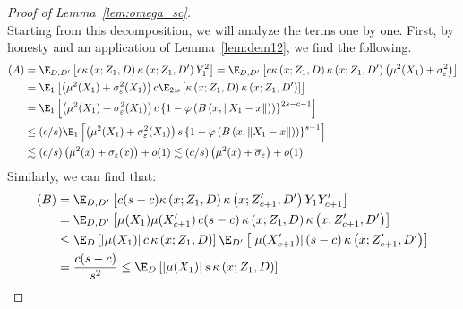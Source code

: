 \begin{proof}[Proof of Lemma~\ref{lem:omega_sc}]
\begin{equation}
	\end{equation}
	Starting from this decomposition, we will analyze the terms one by one.
	First, by honesty and an application of Lemma~\ref{lem:dem12}, we find the following.
	\begin{equation}
		\begin{aligned}
            (A) & = 
			\E_{D, D^{\prime}}\left[c\kappa\left(x; Z_{1}, D\right)\kappa\left(x; Z_{1}, D^{\prime}\right)Y_{1}^{2}\right]
			= \E_{D, D^{\prime}}\left[c\kappa\left(x; Z_{1}, D\right)\kappa\left(x; Z_{1}, D^{\prime}\right)\left(\mu^2(X_1) + \sigma_{\varepsilon}^{2}\right)\right]                                 \\
			 & = \E_{1}\left[\left(\mu^2(X_1) + \sigma_{\varepsilon}^{2}(X_1)\right) c\E_{2:s}\left[\kappa\left(x; Z_{1}, D\right)\kappa\left(x; Z_{1}, D^{\prime}\right)\right]\right] \\
			 & = \E_{1}\left[\left(\mu^2(X_1) + \sigma_{\varepsilon}^{2}(X_1)\right) c\left\{1 - \varphi\left(B\left(x, \|X_1 - x\|\right)\right)\right\}^{2s-c-1}\right]                        \\
			 & \leq (c/s) \E_{1}\left[\left(\mu^2(X_1) + \sigma_{\varepsilon}^{2}(X_1)\right) s\left\{1 - \varphi\left(B\left(x, \|X_1 - x\|\right)\right)\right\}^{s-1}\right]                  \\
			 & \lesssim (c/s)\left(\mu^2(x) + \sigma_{\varepsilon}(x)\right) + o(1)
			\lesssim (c/s)\left(\mu^2(x) + \overline{\sigma}_{\varepsilon}\right) + o(1)
		\end{aligned}
	\end{equation}
	Similarly, we can find that:
	\begin{equation}
		\begin{aligned}
            (B)
			 & = \E_{D, D^{\prime}}\left[c(s-c) \kappa\left(x; Z_{1}, D\right)\kappa\left(x; Z_{c+1}^{\prime}, D^{\prime}\right)Y_{1}Y_{c+1}^{\prime}\right]                                          \\
			 & = \E_{D, D^{\prime}}\left[\mu(X_1)\mu(X_{c+1}^{\prime}) \, c(s-c) \, \kappa\left(x; Z_{1}, D\right)\kappa\left(x; Z_{c+1}^{\prime}, D^{\prime}\right)\right] \\
			 & \leq \E_{D}\left[|\mu(X_1)| \, c \, \kappa\left(x; Z_{1}, D\right)\right]
			\E_{D^{\prime}}\left[|\mu(X_{c+1}^{\prime})| \, (s-c) \, \kappa\left(x; Z_{c+1}^{\prime}, D^{\prime}\right)\right]                                                                               \\
			 & = \frac{c (s-c)}{s^2} \leq \E_{D}\left[|\mu(X_1)| \, s \, \kappa\left(x; Z_{1}, D\right)\right]

\end{aligned}
\end{equation}
\end{proof}
